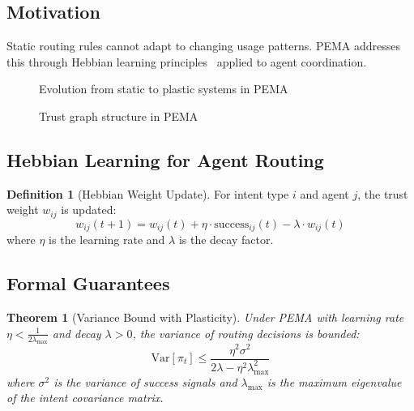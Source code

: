 \documentclass[11pt,a4paper]{article}
\newtheorem{theorem}{Theorem}[section]
\theoremstyle{definition}
\newtheorem{definition}{Definition}[section]
\theoremstyle{remark}
\newcommand{\pema}{\textsc{PEMA}\xspace}
\begin{document}
\subsection{Motivation}

Static routing rules cannot adapt to changing usage patterns. \pema addresses this through Hebbian learning principles~\cite{hebb1949organization} applied to agent coordination.

\begin{figure}[H]
    \centering
    
    \caption{Evolution from static to plastic systems in \pema}
    \label{fig:pema-evolution}
\end{figure}

\begin{figure}[H]
    \centering
    
    \caption{Trust graph structure in \pema}
    \label{fig:trust-graph}
\end{figure}

\subsection{Hebbian Learning for Agent Routing}

\begin{definition}[Hebbian Weight Update]
For intent type $i$ and agent $j$, the trust weight $w_{ij}$ is updated:
\begin{equation}
w_{ij}(t+1) = w_{ij}(t) + \eta \cdot \text{success}_{ij}(t) - \lambda \cdot w_{ij}(t)
\end{equation}
where $\eta$ is the learning rate and $\lambda$ is the decay factor.
\end{definition}

\subsection{Formal Guarantees}

\begin{theorem}[Variance Bound with Plasticity]
\label{thm:variance-bound}
Under \pema with learning rate $\eta < \frac{1}{2\lambda_{\max}}$ and decay $\lambda > 0$, the variance of routing decisions is bounded:
\begin{equation}
\text{Var}[\pi_t] \leq \frac{\eta^2 \sigma^2}{2\lambda - \eta^2 \lambda_{\max}^2}
\end{equation}
where $\sigma^2$ is the variance of success signals and $\lambda_{\max}$ is the maximum eigenvalue of the intent covariance matrix.
\end{theorem}
\end{document}
